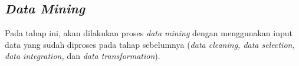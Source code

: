 



\subsection{\textsl{Data Mining}}

Pada tahap ini, akan dilakukan proses \textsl{data mining} dengan menggunakan input data yang sudah diproses pada tahap sebelumnya (\textsl{data cleaning, data selection, data integration,} dan \textsl{data transformation}).

